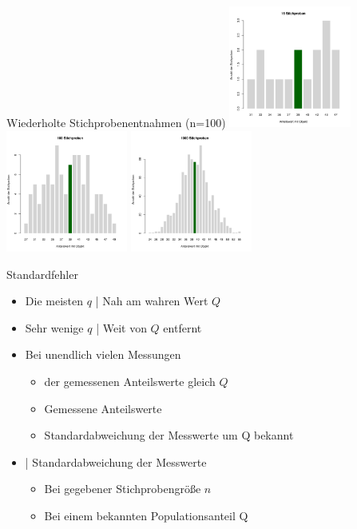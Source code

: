 \begin{frame}
  {Wiederholte Stichprobenentnahmen (n=100)}
  \centering 
  \includegraphics[width=0.3\textwidth]{RVorlesung/manybernoullis1}
  \includegraphics[width=0.3\textwidth]{RVorlesung/manybernoullis2}
  \includegraphics[width=0.3\textwidth]{RVorlesung/manybernoullis3}
\end{frame}


\begin{frame}
  {Standardfehler}
  \begin{itemize}[<+->]
    \item Die \alert{meisten $q$} | Nah am wahren Wert $Q$
    \item Sehr \alert{wenige $q$} | Weit von $Q$ entfernt
      \Halbzeile
    \item Bei unendlich vielen Messungen
      \begin{itemize}[<+->]
        \item \alert{ der gemessenen Anteilswerte gleich $Q$}
        \item Gemessene Anteilswerte 
        \item \alert{Standardabweichung} der Messwerte um Q bekannt  
      \end{itemize}
     \Zeile 
    \item {} | Standardabweichung der Messwerte
      \begin{itemize}[<+->]
        \item Bei \alert{gegebener Stichprobengröße $n$}
        \item Bei einem \alert{bekannten Populationsanteil Q}
      \end{itemize}
  \end{itemize}
\end{frame}

